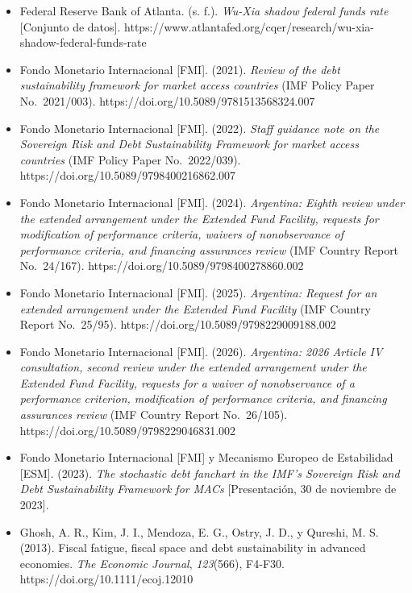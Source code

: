 \begin{itemize}[label={},leftmargin=1.27cm,itemindent=-1.27cm,itemsep=0.6\baselineskip]
{  fiscal policy} (NBER Working Paper No.~12822). National Bureau of
  Economic Research. https://doi.org/10.3386/w12822
\item
  Federal Reserve Bank of Atlanta. (s. f.). \emph{Wu-Xia shadow federal
  funds rate} {[}Conjunto de datos{]}.
  https://www.atlantafed.org/cqer/research/wu-xia-shadow-federal-funds-rate
\item
  Fondo Monetario Internacional {[}FMI{]}. (2021). \emph{Review of the
  debt sustainability framework for market access countries} (IMF Policy
  Paper No.~2021/003). https://doi.org/10.5089/9781513568324.007
\item
  Fondo Monetario Internacional {[}FMI{]}. (2022). \emph{Staff guidance
  note on the Sovereign Risk and Debt Sustainability Framework for
  market access countries} (IMF Policy Paper No.~2022/039).
  https://doi.org/10.5089/9798400216862.007
\item
  Fondo Monetario Internacional {[}FMI{]}. (2024). \emph{Argentina:
  Eighth review under the extended arrangement under the Extended Fund
  Facility, requests for modification of performance criteria, waivers
  of nonobservance of performance criteria, and financing assurances
  review} (IMF Country Report No.~24/167).
  https://doi.org/10.5089/9798400278860.002
\item
  Fondo Monetario Internacional {[}FMI{]}. (2025). \emph{Argentina:
  Request for an extended arrangement under the Extended Fund Facility}
  (IMF Country Report No.~25/95).
  https://doi.org/10.5089/9798229009188.002
\item
  Fondo Monetario Internacional {[}FMI{]}. (2026). \emph{Argentina: 2026
  Article IV consultation, second review under the extended arrangement
  under the Extended Fund Facility, requests for a waiver of
  nonobservance of a performance criterion, modification of performance
  criteria, and financing assurances review} (IMF Country Report
  No.~26/105). https://doi.org/10.5089/9798229046831.002
\item
  Fondo Monetario Internacional {[}FMI{]} y Mecanismo Europeo de
  Estabilidad {[}ESM{]}. (2023). \emph{The stochastic debt fanchart in
  the IMF's Sovereign Risk and Debt Sustainability Framework for MACs}
  {[}Presentación, 30 de noviembre de 2023{]}.
\item
  Ghosh, A. R., Kim, J. I., Mendoza, E. G., Ostry, J. D., y Qureshi, M.
  S. (2013). Fiscal fatigue, fiscal space and debt sustainability in
  advanced economies. \emph{The Economic Journal}, \emph{123}(566),
  F4-F30. https://doi.org/10.1111/ecoj.12010

\end{itemize}

